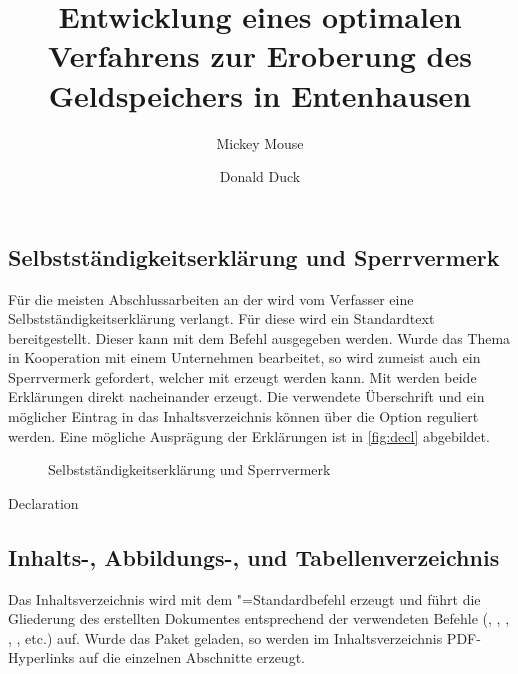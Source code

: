 \documentclass[%
  english,ngerman,%
  geometry=no,DIV=12,automark,%
]{tudscrartcl}
\begin{document}
\subsection{Selbstständigkeitserklärung und Sperrvermerk}
Für die meisten Abschlussarbeiten an der \TnUD wird vom Verfasser eine 
Selbstständigkeitserklärung verlangt. Für diese wird ein Standardtext 
bereitgestellt. Dieser kann mit dem Befehl  ausgegeben 
werden. Wurde das Thema in Kooperation mit einem Unternehmen bearbeitet, so 
wird zumeist auch ein Sperrvermerk gefordert, welcher mit  
erzeugt werden kann. Mit  werden beide Erklärungen direkt 
nacheinander erzeugt. Die verwendete Überschrift und ein möglicher Eintrag in 
das Inhaltsverzeichnis können über die Option  reguliert 
werden. Eine mögliche Ausprägung der Erklärungen ist in \autoref{fig:decl} 
abgebildet.
%
\begin{figure}
\centering
{}
\caption{Selbstständigkeitserklärung und Sperrvermerk}
\label{fig:decl}
\end{figure}

\begin{Hint!}{Declaration}
\title{%
  Entwicklung eines optimalen Verfahrens zur Eroberung des
  Geldspeichers in Entenhausen
}
\author{Mickey Mouse\and Donald Duck}
\declaration[company=FIRMA]
\end{Hint!}
\begin{Trunk+}
\declaration[company=FIRMA]

\end{Trunk+}

\subsection{Inhalts-, Abbildungs-, und Tabellenverzeichnis}
Das Inhaltsverzeichnis wird mit dem "=Standardbefehl 
 erzeugt und führt die Gliederung des erstellten 
Dokumentes entsprechend der verwendeten Befehle (, , 
, , ,  etc.) auf. 
Wurde das Paket  geladen, so werden im Inhaltsverzeichnis 
PDF-Hyperlinks auf die einzelnen Abschnitte erzeugt.
\end{document}
